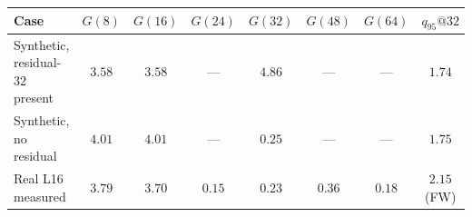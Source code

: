 \documentclass{article}
\begin{document}
\begin{table}[H]
\centering
\footnotesize
\setlength{\tabcolsep}{3.2pt}
\begin{tabular}{@{}lccccccc@{}}
\toprule
Case & $G(8)$ & $G(16)$ & $G(24)$ & $G(32)$ & $G(48)$ & $G(64)$ & $q_{95}@32$ \\
\midrule
\shortstack[l]{Synthetic, residual-$32$\\present} &
$3.58$ & $3.58$ & --- & $4.86$ & --- & --- & $1.74$ \\
Synthetic, no residual &
$4.01$ & $4.01$ & --- & $0.25$ & --- & --- & $1.75$ \\
\cmidrule(lr){2-8}
Real L16 measured &
$3.79$ & $3.70$ & $0.15$ & $0.23$ & $0.36$ & $0.18$ & $2.15$ (FW) \\
\bottomrule
\end{tabular}
\vspace{3pt}


\end{table}
\end{document}
